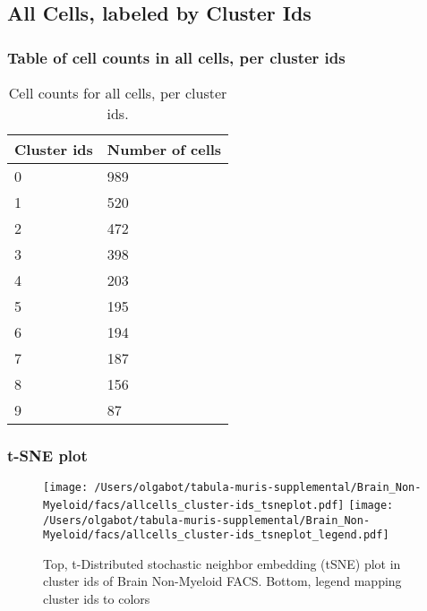 \clearpage
\subsection{All Cells, labeled by Cluster Ids}
\subsubsection{Table of cell counts in all cells, per cluster ids}\begin{table}[h]
\centering
\label{my-label}
\begin{tabular}{@{}ll@{}}
\toprule

Cluster ids& Number of cells \\ \midrule
0 & 989 \\

1 & 520 \\

2 & 472 \\

3 & 398 \\

4 & 203 \\

5 & 195 \\

6 & 194 \\

7 & 187 \\

8 & 156 \\

9 & 87 \\
\bottomrule
\end{tabular}
\caption{Cell counts for all cells, per cluster ids.}
\end{table}

\clearpage
\subsubsection{t-SNE plot}
\begin{figure}[h]
\centering
\texttt{[image: /Users/olgabot/tabula-muris-supplemental/Brain\_Non-Myeloid/facs/allcells\_cluster-ids\_tsneplot.pdf]}
\texttt{[image: /Users/olgabot/tabula-muris-supplemental/Brain\_Non-Myeloid/facs/allcells\_cluster-ids\_tsneplot\_legend.pdf]}
\caption{Top, t-Distributed stochastic neighbor embedding (tSNE) plot  in cluster ids of Brain Non-Myeloid FACS. Bottom, legend mapping cluster ids to colors}
\end{figure}


